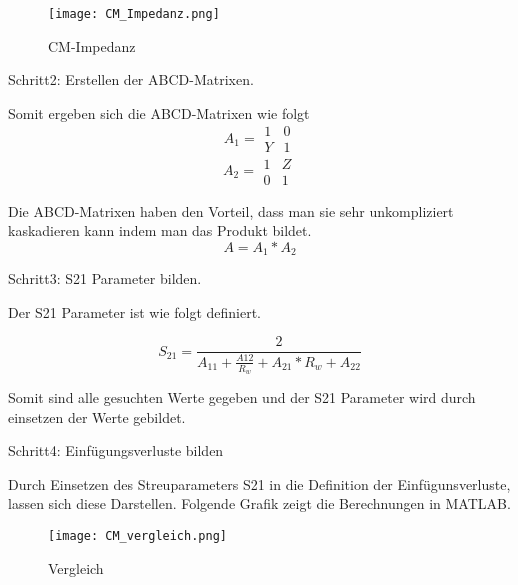 \begin{figure}[H]
	\centering
	\texttt{[image: CM\_Impedanz.png]}
	\caption{CM-Impedanz}
	\label{fig:CM-Impedanz}
\end{figure}
Schritt2: Erstellen der ABCD-Matrixen.

Somit ergeben sich die ABCD-Matrixen wie folgt
\begin{equation}
A_1 =
\begin{matrix}
1 & 0\\ Y&1 
\end{matrix}
\end{equation}
\begin{equation}
A_2 =
\begin{matrix}
1 & Z\\ 0&1 
\end{matrix}
\end{equation}


Die ABCD-Matrixen haben den Vorteil, dass man sie sehr unkompliziert kaskadieren kann indem man das Produkt bildet.
\begin{equation}
A = A_1*A_2
\end{equation}

Schritt3: S21 Parameter bilden.

Der S21 Parameter ist wie folgt definiert.

\begin{equation}
S_{21} = \frac{2}{A_{11}+\frac{A{12}}{R_w}+A_{21}*R_w+A_{22}}
\end{equation}

Somit sind alle gesuchten Werte gegeben und der S21 Parameter wird durch einsetzen der Werte gebildet.

Schritt4: Einfügungsverluste bilden

Durch Einsetzen des Streuparameters S21 in die Definition der Einfügunsverluste, lassen sich diese Darstellen. Folgende Grafik zeigt die Berechnungen in MATLAB. 


\begin{figure}[H]
	\centering
	\texttt{[image: CM\_vergleich.png]}
	\caption{Vergleich}
	\label{fig:Vergleich Berechnung Simulation}
\end{figure}
